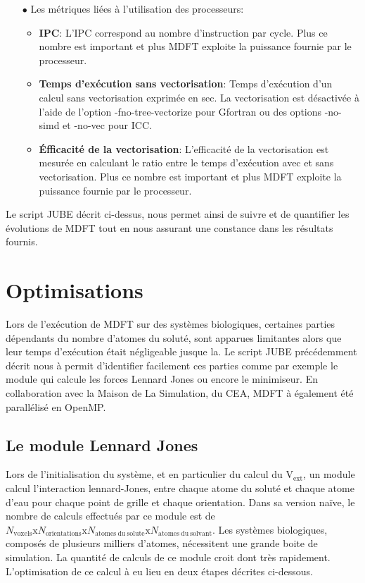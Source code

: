 \begin{itemize}
\item[$\bullet$] Les métriques liées à l'utilisation des processeurs:
  \begin{itemize}
  \item \textbf{IPC}: L'IPC correspond au nombre d'instruction par cycle. Plus ce nombre est important et plus MDFT exploite la puissance fournie par le processeur.
  \item \textbf{Temps d'exécution sans vectorisation}: Temps d’exécution d'un calcul sans vectorisation exprimée en sec. La vectorisation est désactivée à l'aide de l'option -fno-tree-vectorize pour Gfortran ou des options -no-simd et -no-vec pour ICC. 
  \item \textbf{\'Efficacité de la vectorisation}: L'efficacité de la vectorisation est mesurée en calculant le ratio entre le temps d'exécution avec et sans vectorisation. Plus ce nombre est important et plus MDFT exploite la puissance fournie par le processeur.
  \end{itemize}
  \vspace*{1.5ex}%

\end{itemize}

Le script JUBE décrit ci-dessus, nous permet ainsi de suivre et de quantifier les évolutions de MDFT tout en nous assurant une constance dans les résultats fournis.


\section{Optimisations}
Lors de l'exécution de MDFT sur des systèmes biologiques, certaines parties dépendants du nombre d'atomes du soluté, sont apparues limitantes alors que leur temps d'exécution était négligeable jusque la. Le script JUBE précédemment décrit nous à permit d'identifier facilement ces parties comme par exemple le module qui calcule les forces Lennard Jones ou encore le minimiseur. En collaboration avec la Maison de La Simulation, du CEA, MDFT à également été parallélisé en OpenMP.


\subsection{Le module Lennard Jones}
Lors de l’initialisation du système, et en particulier du calcul du $\mathrm{V}_\mathrm{ext}$, un module calcul l’interaction lennard-Jones, entre chaque atome du soluté et chaque atome d'eau pour chaque point de grille et chaque orientation. Dans sa version naïve, le nombre de calculs effectués par ce module est de $N_{\mathrm{voxels}}\mathrm{x}N_{\mathrm{orientations}}\mathrm{x}N_{\mathrm{atomes\ du\ solute}}\mathrm{x}N_{\mathrm{atomes\ du\ solvant}}$. Les systèmes biologiques, composés de plusieurs milliers d'atomes, nécessitent une grande boite de simulation. La quantité de calculs de ce module croit dont très rapidement. L'optimisation de ce calcul à eu lieu en deux étapes décrites ci-dessous.

